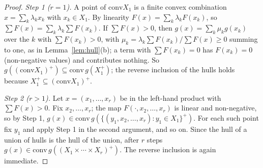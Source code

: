 \documentclass{article} %
\begin{document}
\begin{proof}
\emph{Step 1 ($r=1$).} A point of $\mathrm{conv}X_1$ is a finite convex combination
$x=\sum_k\lambda_kx_k$ with $x_k\in X_1$. By linearity $F(x)=\sum_k\lambda_kF(x_k)$, so
$\sum F(x)=\sum_k\lambda_k\sum F(x_k)$. If $\sum F(x)>0$, then
$g(x)=\sum_k\mu_kg(x_k)$ over the $k$ with $\sum F(x_k)>0$, with
$\mu_k=\lambda_k\sum F(x_k)/\sum F(x)\ge0$ summing to one, as in Lemma~\ref{lem:hull}(b); a
term with $\sum F(x_k)=0$ has $F(x_k)=0$ (non-negative values) and contributes nothing. So
$g((\mathrm{conv}X_1)^+)\subseteq\mathrm{conv}\,g(X_1^+)$; the reverse inclusion of the hulls
holds because $X_1^+\subseteq(\mathrm{conv}X_1)^+$.

\emph{Step 2 ($r>1$).} Let $x=(x_1,\dots,x_r)$ be in the left-hand product with $\sum F(x)>0$.
Fix $x_2,\dots,x_r$; the map $F(\cdot,x_2,\dots,x_r)$ is linear and non-negative, so by
Step 1, $g(x)\in\mathrm{conv}\,g(\{(y_1,x_2,\dots,x_r):y_1\in X_1\}^+)$. For each such point
fix $y_1$ and apply Step 1 in the second argument, and so on. Since the hull of a union of
hulls is the hull of the union, after $r$ steps $g(x)\in\mathrm{conv}\,g((X_1\times\cdots\times
X_r)^+)$. The reverse inclusion is again immediate.
\end{proof}
\end{document}
